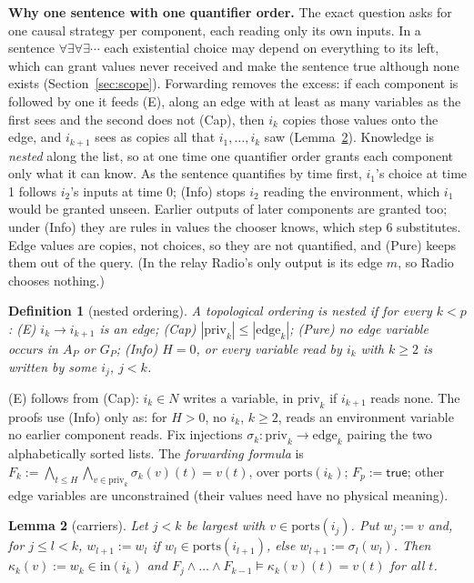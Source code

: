 \documentclass[10pt]{article}
\theoremstyle{tplain}\newtheorem{theorem}{Theorem}\newtheorem{lemma}[theorem]{Lemma}\newtheorem{proposition}[theorem]{Proposition}\newtheorem{corollary}[theorem]{Corollary}
\theoremstyle{tdef}\newtheorem{definition}[theorem]{Definition}
\newcommand{\inp}{\mathrm{in}}\newcommand{\outp}{\mathrm{out}}\newcommand{\ports}{\mathrm{ports}}
\newcommand{\priv}{\mathrm{priv}}\newcommand{\edge}{\mathrm{edge}}
\newcommand{\TRUE}{\mathsf{true}}\newcommand{\FALSE}{\mathsf{false}}
\begin{document}
\textbf{Why one sentence with one quantifier order.} The exact question asks for one causal strategy per component, each reading only its own inputs. In a sentence $\forall\exists\forall\exists\cdots$ each existential choice may depend on everything to its left, which can grant values never received and make the sentence true although none exists (Section~\ref{sec:scope}). Forwarding removes the excess: if each component is followed by one it feeds (E), along an edge with at least as many variables as the first sees and the second does not (Cap), then $i_k$ copies those values onto the edge, and $i_{k+1}$ sees as copies all that $i_1,\dots,i_k$ saw (Lemma~\ref{lem:carry}). Knowledge is \emph{nested} along the list, so at one time one quantifier order grants each component only what it can know. As the sentence quantifies by time first, $i_1$'s choice at time 1 follows $i_2$'s inputs at time 0; (Info) stops $i_2$ reading the environment, which $i_1$ would be granted unseen. Earlier outputs of later components are granted too; under (Info) they are rules in values the chooser knows, which step 6 substitutes. Edge values are copies, not choices, so they are not quantified, and (Pure) keeps them out of the query. (In the relay Radio's only output is its edge $m$, so Radio chooses nothing.)
\begin{definition}[nested ordering]
A topological ordering is \emph{nested} if for every $k<p$: (E) $i_k\to i_{k+1}$ is an edge; (Cap) $|\priv_k|\le|\edge_k|$; (Pure) no edge variable occurs in $A_P$ or $G_P$; (Info) $H=0$, or every variable read by $i_k$ with $k\ge2$ is written by some $i_j$, $j<k$.
\end{definition}
(E) follows from (Cap): $i_k\in N$ writes a variable, in $\priv_k$ if $i_{k+1}$ reads none. The proofs use (Info) only as: for $H>0$, no $i_k$, $k\ge2$, reads an environment variable no earlier component reads. Fix injections $\sigma_k:\priv_k\to\edge_k$ pairing the two alphabetically sorted lists. The \emph{forwarding formula} is $F_k:=\bigwedge_{t\le H}\bigwedge_{v\in\priv_k}\sigma_k(v)(t)=v(t)$, over $\ports(i_k)$; $F_p:=\TRUE$; other edge variables are unconstrained (their values need have no physical meaning).
\begin{lemma}[carriers]\label{lem:carry}
Let $j<k$ be largest with $v\in\ports(i_j)$. Put $w_j:=v$ and, for $j\le l<k$, $w_{l+1}:=w_l$ if $w_l\in\ports(i_{l+1})$, else $w_{l+1}:=\sigma_l(w_l)$. Then $\kappa_k(v):=w_k\in\inp(i_k)$ and $F_j\wedge\dots\wedge F_{k-1}\models\kappa_k(v)(t)=v(t)$ for all $t$.
\end{lemma}
\end{document}
